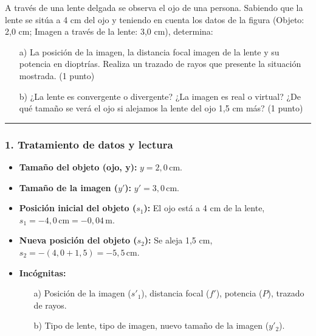 \begin{cajaenunciado}
A través de una lente delgada se observa el ojo de una persona. Sabiendo que la lente se sitúa a 4 cm del ojo y teniendo en cuenta los datos de la figura (Objeto: 2,0 cm; Imagen a través de la lente: 3,0 cm), determina:
\begin{enumerate}
    \item[a)] La posición de la imagen, la distancia focal imagen de la lente y su potencia en dioptrías. Realiza un trazado de rayos que presente la situación mostrada. (1 punto)
    \item[b)] ¿La lente es convergente o divergente? ¿La imagen es real o virtual? ¿De qué tamaño se verá el ojo si alejamos la lente del ojo 1,5 cm más? (1 punto)
\end{enumerate}
\end{cajaenunciado}
\hrule

\subsubsection*{1. Tratamiento de datos y lectura}
\begin{itemize}
    \item \textbf{Tamaño del objeto (ojo, y):} $y = 2,0 \, \text{cm}$.
    \item \textbf{Tamaño de la imagen ($y'$):} $y' = 3,0 \, \text{cm}$.
    \item \textbf{Posición inicial del objeto ($s_1$):} El ojo está a 4 cm de la lente, $s_1 = -4,0 \, \text{cm} = -0,04 \, \text{m}$.
    \item \textbf{Nueva posición del objeto ($s_2$):} Se aleja 1,5 cm, $s_2 = -(4,0 + 1,5) = -5,5 \, \text{cm}$.
    \item \textbf{Incógnitas:}
    \begin{itemize}
        \item[a)] Posición de la imagen ($s'_1$), distancia focal ($f'$), potencia ($P$), trazado de rayos.
        \item[b)] Tipo de lente, tipo de imagen, nuevo tamaño de la imagen ($y'_2$).
    \end{itemize}
\end{itemize}

